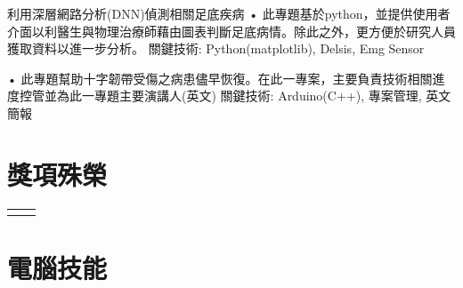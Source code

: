 \documentclass[10pt]{article} %
\begin{document}
\begin{paracol}{2}
\longformdescriptionwithremind 
{利用深層網路分析(DNN)偵測相關足底疾病}
{• 此專題基於python，並提供使用者介面以利醫生與物理治療師藉由圖表判斷足底病情。除此之外，更方便於研究人員獲取資料以進一步分析。}
{關鍵技術: Python(matplotlib), Delsis, Emg Sensor}
\vspace{.25cm}

{• 此專題幫助十字韌帶受傷之病患儘早恢復。在此一專案，主要負責技術相關進度控管並為此一專題主要演講人(英文)}
{關鍵技術: Arduino(C++), 專案管理, 英文簡報}



\section{獎項殊榮}
\begin{supertabular}{rl} %
	
	
	
	
	
\end{supertabular}


\section{電腦技能} 
\begin{supertabular}{rl} %
	

\end{supertabular}
\end{paracol}
\end{document}
